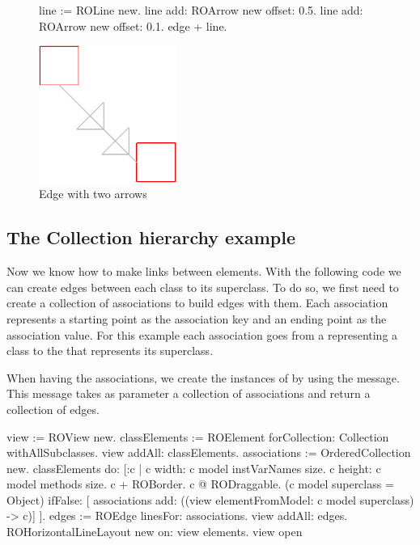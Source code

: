 \documentclass[a4paper,10pt,twoside]{book}
\begin{document}
\begin{figure}[H]
      \begin{minipage}[t]{0.5\textwidth}
      \vspace{0pt}
     \begin{code}{}
line := ROLine new.
line add: ROArrow new offset: 0.5.
line add: ROArrow new offset: 0.1.
edge + line. \end{code}
   \end{minipage}
   \hfill
   \begin{minipage}[t]{0.4\textwidth}
      \vspace{0pt} \raggedright
       \centering
		\includegraphics[width=0.4\textwidth]{twoArrowEdge}
   \end{minipage}
\caption{Edge with two arrows}
\label{fig:twoArrowEdge}
\end{figure} 

\subsection*{The Collection hierarchy example}
Now we know how to make links between elements. With the following code we can create edges between each class to its superclass. 
To do so, we first need to create a collection of associations to build edges with them. Each association represents a starting point as the association key and an ending point as the association value. For this example each association goes from a  representing a class to the  that represents its superclass. 

When having the associations, we create the instances of  by using the  message. This message takes as parameter a collection of associations and return a collection of edges.


\begin{code}{}
view := ROView new.
classElements := ROElement forCollection: Collection withAllSubclasses.
view addAll: classElements.
associations := OrderedCollection new.
classElements do: [:c | 
	c width: c model instVarNames size.
	c height: c model methods size.
	c + ROBorder. 
	c @ RODraggable.	
	(c model superclass = Object)
		ifFalse: [ associations add: ((view elementFromModel: c model superclass) -> c)]	
	 ].
edges := ROEdge linesFor: associations.
view addAll: edges.
ROHorizontalLineLayout new on: view elements.
view open
\end{code}
\end{document}
